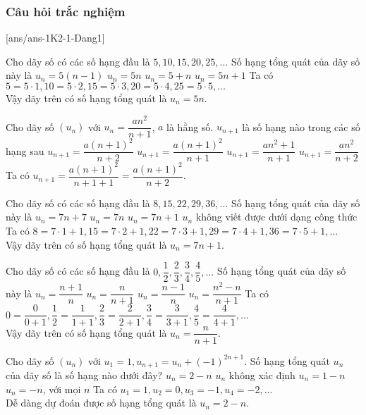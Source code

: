 \subsubsection{Câu hỏi trắc nghiệm}
[ans/ans-1K2-1-Dang1]
\begin{ex}%
	Cho dãy số có các số hạng đầu là $5,10,15,20,25, \ldots$ Số hạng tổng quát của dãy số này là
	\choice
	{$ u_n=5(n-1) $}
	{\True$ u_n=5n $}
	{$ u_n=5+n $}
	{$ u_n=5n+1 $}
	\loigiai
	{Ta có $5=5\cdot 1, 10=5 \cdot 2, 15 = 5\cdot 3, 20=5 \cdot 4, 25 = 5\cdot 5, \ldots$\\
		Vậy dãy trên có số hạng tổng quát là $u_n=5n$.
	}
\end{ex}
\begin{ex}%
	Cho dãy số $(u_n)$ với $u_n=\dfrac{an^2}{n+1}$, $a$ là hằng số. $u_{n+1}$ là số hạng nào trong các số hạng sau
	\choice
	{\True $u_{n+1}=\dfrac{a(n+1)^2}{n+2} $}
	{$u_{n+1}=\dfrac{a(n+1)^2}{n+1}$}
	{$u_{n+1}=\dfrac{an^2+1}{n+1}$}
	{$u_{n+1}=\dfrac{an^2}{n+2} $}
	\loigiai
	{Ta có $u_{n+1}=\dfrac{a(n+1)^2}{n+1+1}=\dfrac{a(n+1)^2}{n+2}$.
	}
\end{ex}
\begin{ex}%
	Cho dãy số có các số hạng đầu là $8,15,22,29,36, \ldots$ Số hạng tổng quát của dãy số này là
	\choice
	{$ u_n=7n+7 $}
	{$ u_n=7n $}
	{\True $ u_n=7n+1 $}
	{$ u_n$ không viết được dưới dạng công thức }
	\loigiai
	{Ta có $8=7\cdot 1+1, 15=7 \cdot 2+1, 22 = 7\cdot 3+1, 29=7 \cdot 4+1, 36 = 7\cdot 5+1, \ldots$\\
		Vậy dãy trên có số hạng tổng quát là $u_n=7n+1$.
	}
\end{ex}
\begin{ex}%
	Cho dãy số có các số hạng đầu là $0,\dfrac{1}{2},\dfrac{2}{3},\dfrac{3}{4},\dfrac{4}{5}, \ldots$ Số hạng tổng quát của dãy số này là
	\choice
	{$ u_n=\dfrac{n+1}{n}$}
	{\True $ u_n=\dfrac{n}{n+1} $}
	{$ u_n=\dfrac{n-1}{n}$}
	{$ u_n=\dfrac{n^2-n}{n+1}$  }
	\loigiai
	{Ta có $0=\dfrac{0}{0+1}, \dfrac{1}{2}=\dfrac{1}{1+1} ,\dfrac{2}{3} = \dfrac{2}{2+1}, \dfrac{3}{4}=\dfrac{3}{3+1}, \dfrac{4}{5} = \dfrac{4}{4+1}, \ldots$\\
		Vậy dãy trên có số hạng tổng quát là $u_n=\dfrac{n}{n+1}$.
	}
\end{ex}
\begin{ex}%
	Cho dãy số $(u_n)$ với $u_1=1, u_{n+1}=u_n+(-1)^{2n+1}$. Số hạng tổng quát $u_n$ của dãy số là số hạng nào dưới đây?
	\choice
	{\True $ u_n=2-n$}
	{$ u_n$ không xác định}
	{$ u_n=1-n$}
	{$ u_n=-n$, với mọi $n$ }
	\loigiai
	{Ta có $u_1=1, u_2=0 ,u_3 = -1, u_4=-2,  \ldots$\\
		Dễ dàng dự đoán được số hạng tổng quát là $u_n=2-n$.
	}
\end{ex}
